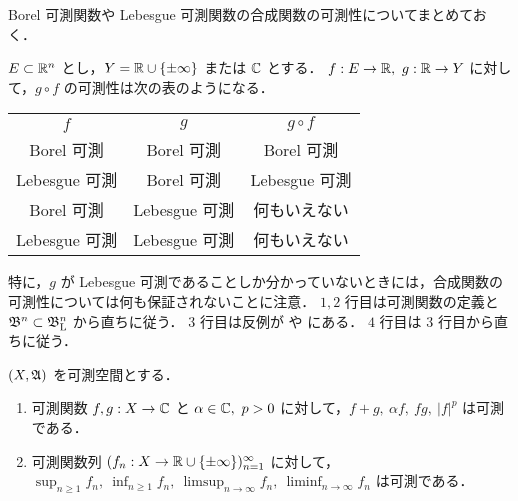 \begin{remark}\label{rem:Borel_Lebesgue_composition}
    Borel 可測関数や Lebesgue 可測関数の合成関数の可測性についてまとめておく．

    $E\subset\mathbb{R}^n$ とし，$Y=\mathbb{R}\cup\{\pm\infty\}$ または $\mathbb{C}$ とする．
    $f:E\to\mathbb{R},\ g:\mathbb{R}\to Y$ に対して，$g\circ f$ の可測性は次の表のようになる．

    \begin{table}[h]
        \centering
        \begin{tabular}{|c|c||c|}
            \hline
            $f$ & $g$ & $g\circ f$\\
            \hhline{|=|=#=|}
            Borel 可測 & Borel 可測 & Borel 可測\\
            \hline
            Lebesgue 可測 & Borel 可測 & Lebesgue 可測\\
            \hline
            Borel 可測 & Lebesgue 可測 & 何もいえない\\
            \hline
            Lebesgue 可測 & Lebesgue 可測 & 何もいえない\\
            \hline
        \end{tabular}
    \end{table}

    特に，$g$ が Lebesgue 可測であることしか分かっていないときには，合成関数の可測性については何も保証されないことに注意．
    $1,2$ 行目は可測関数の定義と $\mathfrak{B}^n\subset\mathfrak{B}_{\mathrm{L}}^n$ から直ちに従う．
    $3$ 行目は反例が \cite[\S2 Exercise 9]{Fo99} や \cite[pp.72--73]{It63} にある．
    $4$ 行目は $3$ 行目から直ちに従う．
\end{remark}

\begin{theorem}\label{thm:elementary_measuable_functions}
    $(X,\mathfrak{A})$ を可測空間とする．
    \begin{enumerate}
        \item 可測関数 $f,g:X\to\mathbb{C}$ と $\alpha\in\mathbb{C},\ p>0$ に対して，$f+g,\ \alpha f,\ fg,\ |f|^p$ は可測である．
        \item 可測関数列 $(f_n:X\to\mathbb{R}\cup\{\pm\infty\})_{n=1}^\infty$ に対して，
            $\displaystyle\sup_{n\ge1}f_n,\ \inf_{n\ge1}f_n,\ \limsup_{n\to\infty}f_n,\ \liminf_{n\to\infty}f_n$ は可測である．
    \end{enumerate}
\end{theorem}

